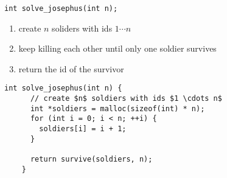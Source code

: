 \begin{frame}[fragile]{\texttt{int solve\_josephus(int n);}}

  \begin{enumerate}
    \setlength{\itemsep}{6pt}
    \item create $n$ soliders with ids $1 \cdots n$
    \item keep killing each other until only one soldier survives
    \item return the id of the survivor
  \end{enumerate}

  \vspace{0.20cm}
  \pause
  \begin{lstlisting}[style = Cstyle]
    int solve_josephus(int n) {
      // create $n$ soldiers with ids $1 \cdots n$
      int *soldiers = malloc(sizeof(int) * n);
      for (int i = 0; i < n; ++i) {
        soldiers[i] = i + 1;
      }

      return survive(soldiers, n);
    }
  \end{lstlisting}
\end{frame}

